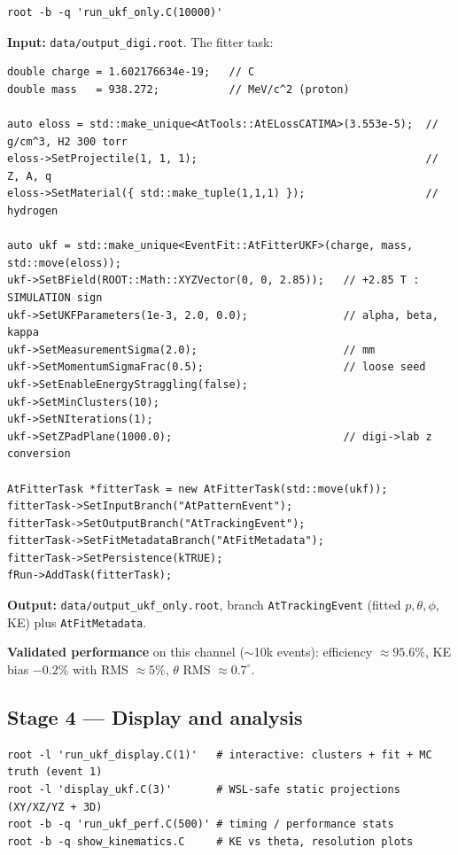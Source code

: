\documentclass[11pt,a4paper]{article}
\newcommand{\code}[1]{\texttt{\small #1}}
\newcommand{\file}[1]{\texttt{\small #1}}
\begin{document}
\begin{lstlisting}[style=bash]
root -b -q 'run_ukf_only.C(10000)'
\end{lstlisting}

\textbf{Input:} \file{data/output\_digi.root}. The fitter task:

\begin{lstlisting}
double charge = 1.602176634e-19;   // C
double mass   = 938.272;           // MeV/c^2 (proton)

auto eloss = std::make_unique<AtTools::AtELossCATIMA>(3.553e-5);  // g/cm^3, H2 300 torr
eloss->SetProjectile(1, 1, 1);                                    // Z, A, q
eloss->SetMaterial({ std::make_tuple(1,1,1) });                   // hydrogen

auto ukf = std::make_unique<EventFit::AtFitterUKF>(charge, mass, std::move(eloss));
ukf->SetBField(ROOT::Math::XYZVector(0, 0, 2.85));   // +2.85 T : SIMULATION sign
ukf->SetUKFParameters(1e-3, 2.0, 0.0);               // alpha, beta, kappa
ukf->SetMeasurementSigma(2.0);                       // mm
ukf->SetMomentumSigmaFrac(0.5);                      // loose seed
ukf->SetEnableEnergyStraggling(false);
ukf->SetMinClusters(10);
ukf->SetNIterations(1);
ukf->SetZPadPlane(1000.0);                           // digi->lab z conversion

AtFitterTask *fitterTask = new AtFitterTask(std::move(ukf));
fitterTask->SetInputBranch("AtPatternEvent");
fitterTask->SetOutputBranch("AtTrackingEvent");
fitterTask->SetFitMetadataBranch("AtFitMetadata");
fitterTask->SetPersistence(kTRUE);
fRun->AddTask(fitterTask);
\end{lstlisting}

\textbf{Output:} \file{data/output\_ukf\_only.root}, branch \code{AtTrackingEvent}
(fitted $p,\theta,\phi,$ KE) plus \code{AtFitMetadata}.

\begin{notebox}
\textbf{Validated performance} on this channel ($\sim$10k events): efficiency
$\approx 95.6\%$, KE bias $-0.2\%$ with RMS $\approx 5\%$, $\theta$ RMS
$\approx 0.7^\circ$.
\end{notebox}

\subsection{Stage 4 --- Display and analysis}

\begin{lstlisting}[style=bash]
root -l 'run_ukf_display.C(1)'   # interactive: clusters + fit + MC truth (event 1)
root -l 'display_ukf.C(3)'       # WSL-safe static projections (XY/XZ/YZ + 3D)
root -b -q 'run_ukf_perf.C(500)' # timing / performance stats
root -b -q show_kinematics.C     # KE vs theta, resolution plots
\end{lstlisting}
\end{document}
